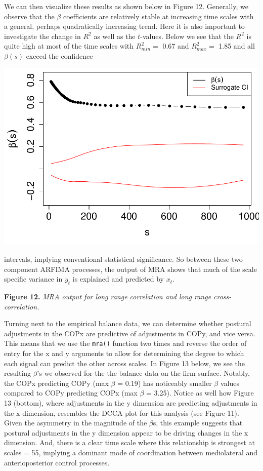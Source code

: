 \documentclass[
  man]{apa6}
\begin{document}
We can then visualize these results as shown below in Figure 12.
Generally, we observe that the \(\beta\) coefficients are relatively
stable at increasing time scales with a general, perhaps quadratically
increasing trend. Here it is also important to investigate the change in
\(R^2\) as well as the \(t\)-values. Below we see that the \(R^2\) is quite
high at most of the time scales with \(R^2_{min} =\)
0.67 and \(R^2_{max} =\)
1.85 and all \(\beta(s)\) exceed the confidence

\includegraphics{fractal_regression_paper_brm_files/figure-latex/unnamed-chunk-24-1.pdf}

intervals, implying conventional statistical significance. So between
these two component ARFIMA processes, the output of MRA shows that much
of the scale specific variance in \(y_t\) is explained and predicted by
\(x_t\).

\textbf{Figure 12.} \emph{MRA output for long range correlation and long range
cross-correlation.}

Turning next to the empirical balance data, we can determine whether
postural adjustments in the COPx are predictive of adjustments in COPy,
and vice versa. This means that we use the \texttt{mra()} function two times
and reverse the order of entry for the x and y arguments to allow for
determining the degree to which each signal can predict the other across
scales. In Figure 13 below, we see the resulting \(\beta\)'s we observed
for the the balance data on the firm surface. Notably, the COPx
predicting COPy (max \(\beta\) = 0.19) has
noticeably smaller \(\beta\) values compared to COPy predicting COPx (max
\(\beta\) = 3.25). Notice as well how Figure 13
(bottom), where adjustments in the y dimension are predicting
adjustments in the x dimension, resembles the DCCA plot for this
analysis (see Figure 11). Given the asymmetry in the magnitude of the
\(\beta\)s, this example suggests that postural adjustments in the y
dimension appear to be driving changes in the x dimension. And, there is
a clear time scale where this relationship is strongest at scales =
55, implying a
dominant mode of coordination between mediolateral and anterioposterior
control processes.
\end{document}
